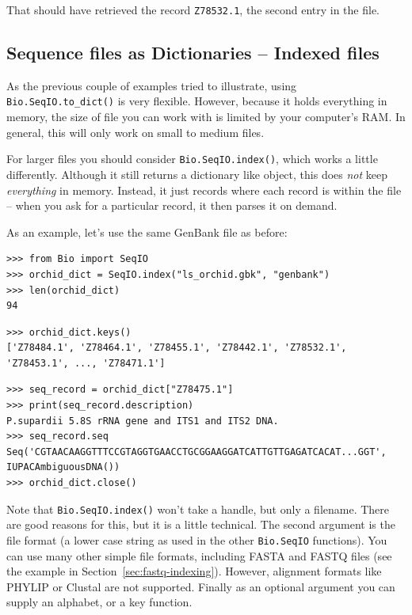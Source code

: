 \documentclass{report}
\begin{document}
\noindent That should have retrieved the record {\tt Z78532.1}, the second entry in the file.

\subsection{Sequence files as Dictionaries -- Indexed files}
\label{sec:SeqIO-index}

As the previous couple of examples tried to illustrate, using
\verb|Bio.SeqIO.to_dict()| is very flexible. However, because it holds
everything in memory, the size of file you can work with is limited by your
computer's RAM. In general, this will only work on small to medium files.

For larger files you should consider
\verb|Bio.SeqIO.index()|, which works a little differently. Although
it still returns a dictionary like object, this does \emph{not} keep
\emph{everything} in memory. Instead, it just records where each record
is within the file -- when you ask for a particular record, it then parses
it on demand.

As an example, let's use the same GenBank file as before:

\begin{verbatim}
>>> from Bio import SeqIO
>>> orchid_dict = SeqIO.index("ls_orchid.gbk", "genbank")
>>> len(orchid_dict)
94
\end{verbatim}
\begin{verbatim}
>>> orchid_dict.keys()
['Z78484.1', 'Z78464.1', 'Z78455.1', 'Z78442.1', 'Z78532.1', 'Z78453.1', ..., 'Z78471.1']
\end{verbatim}
\begin{verbatim}
>>> seq_record = orchid_dict["Z78475.1"]
>>> print(seq_record.description)
P.supardii 5.8S rRNA gene and ITS1 and ITS2 DNA.
>>> seq_record.seq
Seq('CGTAACAAGGTTTCCGTAGGTGAACCTGCGGAAGGATCATTGTTGAGATCACAT...GGT', IUPACAmbiguousDNA())
>>> orchid_dict.close()
\end{verbatim}

\noindent Note that \verb|Bio.SeqIO.index()| won't take a handle,
but only a filename. There are good reasons for this, but it is a little
technical. The second argument is the file format (a lower case string as
used in the other \verb|Bio.SeqIO| functions). You can use many other
simple file formats, including FASTA and FASTQ files (see the example in
Section~\ref{sec:fastq-indexing}). However, alignment
formats like PHYLIP or Clustal are not supported. Finally as an optional
argument you can supply an alphabet, or a key function.
\end{document}
